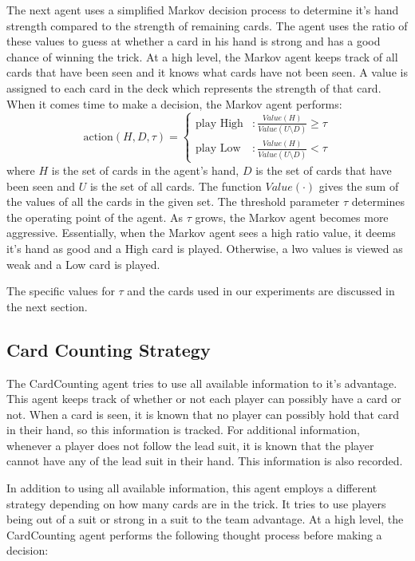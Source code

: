 The next agent uses a simplified Markov decision process to determine it's hand strength compared to the strength of remaining cards.
The agent uses the ratio of these values to guess at whether a card in his hand is strong and has a good chance of winning the trick.
At a high level, the Markov agent keeps track of all cards that have been seen and it knows what cards have not been seen. A value is
assigned to each card in the deck which represents the strength of that card. When it comes time to make a decision, the Markov agent
performs:
\begin{equation}
    \text{action}(H, D, \tau) = \left\{ \begin{array}{lr}
            \text{play High} & : \frac{Value(H)}{Value(U \setminus D)} \geq \tau \\
            \text{play Low}  & : \frac{Value(H)}{Value(U \setminus D)} < \tau 
        \end{array} \right. \nonumber
\end{equation}
where $H$ is the set of cards in the agent's hand, $D$ is the set of cards that have been seen and $U$ is the set of all cards. The function
$Value(\cdot)$ gives the sum of the values of all the cards in the given set. The threshold parameter $\tau$ determines the operating point
of the agent. As $\tau$ grows, the Markov agent becomes more aggressive. Essentially, when the Markov agent sees a high ratio value,
it deems it's hand as good and a High card is played. Otherwise, a lwo values is viewed as weak and a Low card is played.

The specific values for $\tau$ and the cards used in our experiments are discussed in the next section.


\subsection{Card Counting Strategy}

The CardCounting agent tries to use all available information to it's advantage. This agent keeps track of whether or not each player can
possibly have a card or not. When a card is seen, it is known that no player can possibly hold that card in their hand, so this information
is tracked. For additional information, whenever a player does not follow the lead suit, it is known that the player cannot have any of the
lead suit in their hand. This information is also recorded.

In addition to using all available information, this agent employs a different strategy depending on how many cards are in the trick.
It tries to use players being out of a suit or strong in a suit to the team advantage. At a high level, the CardCounting agent performs
the following thought process before making a decision:

